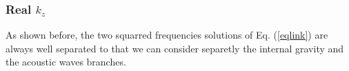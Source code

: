 %
%
\subsubsection{Real $k_z$}
As shown before, the two squarred frequencies solutions of Eq. (\ref{eqlink}) are always well separated to that we can consider separetly the internal gravity and the acoustic waves branches.
